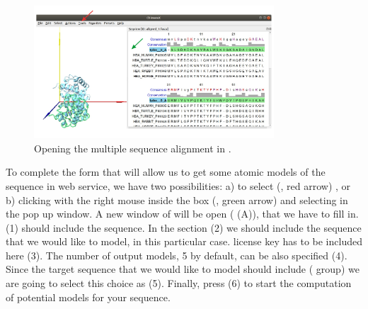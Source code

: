 \begin{itemize}
 \begin{figure}[H]
  \centering 
  \captionsetup{width=.9\linewidth} 
  \includegraphics[width=0.80\textwidth]{Images/Fig14}
  \caption{Opening the multiple sequence alignment in \chimera.}
  \label{fig:chimera_alignment}
  \end{figure}
\end{itemize}

To complete the form that will allow us to get some atomic models of the  sequence in \modeller web service, we have two possibilities: a) to select  (, red arrow) , or b) clicking with the right mouse inside the  box (, green arrow) and selecting  in the pop up window. A new window of  will be open ( (A)), that we have to fill in.  (1) should include the  sequence. In the  section (2) we should include the  sequence that we would like to model,  in this particular case. \modeller license key has to be included here (3). The number of output models, 5 by default, can be also specified (4). Since the target sequence that we would like to model should include  ( group) we are going to select this choice as  (5). Finally, press  (6) to start the computation of potential models for your  sequence.\\

